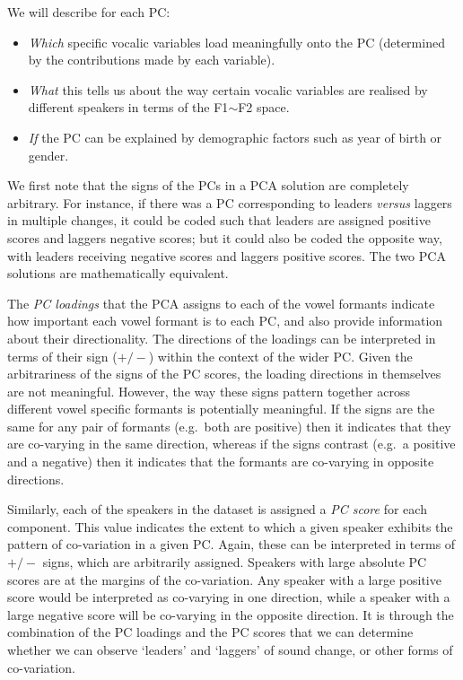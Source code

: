 \documentclass[review]{elsarticle} %
\begin{document}
We will describe for each PC:

\begin{itemize}

    \item \textit{Which} specific vocalic variables load meaningfully onto the PC (determined by the contributions made by each variable).
    
    \item \textit{What} this tells us about the way certain vocalic variables are realised by different speakers in terms of the F1$\sim$F2 space.
    
    \item \textit{If} the PC can be explained by demographic factors such as year of birth or gender.
    
\end{itemize}

We first note that the signs of the PCs in a PCA solution are completely arbitrary. For instance, if there was a PC corresponding to leaders \textit{versus} laggers in multiple changes, it could be coded such that leaders are assigned positive scores and laggers negative scores; but it could also be coded the opposite way, with leaders receiving negative scores and laggers positive scores. The two PCA solutions are mathematically equivalent.

The {\em PC loadings} that the PCA assigns to each of the vowel formants indicate how important each vowel formant is to each PC, and also provide information about their directionality. The directions of the loadings can be interpreted in terms of their sign ($+/-$) within the context of the wider PC. Given the arbitrariness of the signs of the PC scores, the loading directions in themselves are not meaningful. However, the way these signs pattern together across different vowel specific formants is potentially meaningful. If the signs are the same for any pair of formants (e.g.\ both are positive) then it indicates that they are co-varying in the same direction, whereas if the signs contrast (e.g.\ a positive and a negative) then it indicates that the formants are co-varying in opposite directions.

Similarly, each of the speakers in the dataset is assigned a {\em PC score} for each component. This value indicates the extent to which a given speaker exhibits the pattern of co-variation in a given PC. Again, these can be interpreted in terms of $+/-$ signs, which are arbitrarily assigned. Speakers with large absolute PC scores are at the margins of the co-variation. Any speaker with a large positive score would be interpreted as co-varying in one direction, while a speaker with a large negative score will be co-varying in the opposite direction. It is through the combination of the PC loadings and the PC scores that we can determine whether we can observe `leaders' and `laggers' of sound change, or other forms of co-variation.
\end{document}
